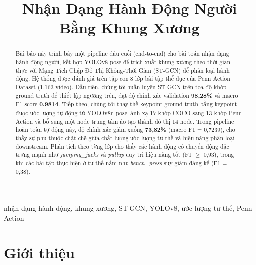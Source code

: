 \documentclass[conference]{IEEEtran}
\begin{document}
\title{Nhận Dạng Hành Động Người Bằng Khung Xương}

\author{
  \and
}

\maketitle

\renewcommand{\thetable}{\arabic{table}}

\begin{abstract}
Bài báo này trình bày một pipeline đầu cuối (end-to-end) cho bài toán nhận dạng
hành động người, kết hợp YOLOv8-pose để trích xuất khung xương theo thời gian
thực với Mạng Tích Chập Đồ Thị Không-Thời Gian (ST-GCN) để phân loại hành động.
Hệ thống được đánh giá trên tập con 8 lớp bài tập thể dục của Penn Action Dataset
(1.163 video). Đầu tiên, chúng tôi huấn luyện ST-GCN trên tọa độ khớp ground
truth để thiết lập ngưỡng trên, đạt độ chính xác validation \textbf{98,28\%} và
macro F1-score \textbf{0,9814}. Tiếp theo, chúng tôi thay thế keypoint ground truth
bằng keypoint được ước lượng tự động từ YOLOv8n-pose, ánh xạ 17 khớp COCO sang
13 khớp Penn Action và bổ sung một node trung tâm ảo tạo thành đồ thị 14 node.
Trong pipeline hoàn toàn tự động này, độ chính xác giảm xuống \textbf{73,82\%}
(macro F1 = 0,7239), cho thấy sự phụ thuộc chặt chẽ giữa chất lượng ước lượng
tư thế và hiệu năng phân loại downstream. Phân tích theo từng lớp cho thấy các
hành động có chuyển động đặc trưng mạnh như \textit{jumping\_jacks} và
\textit{pullup} duy trì hiệu năng tốt (F1 $\geq$ 0,93), trong khi các bài tập
thực hiện ở tư thế nằm như \textit{bench\_press} suy giảm đáng kể (F1 = 0,38).
\end{abstract}

\begin{IEEEkeywords}
nhận dạng hành động, khung xương, ST-GCN, YOLOv8, ước lượng tư thế, Penn Action
\end{IEEEkeywords}

\section{Giới thiệu}
\label{sec:intro}
\end{document}
